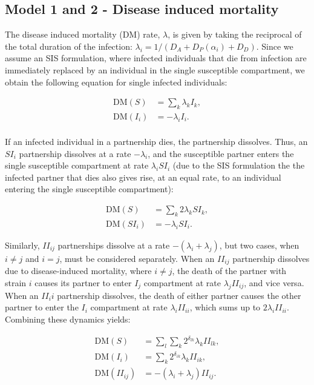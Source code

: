 \documentclass[10pt,letterpaper]{article}
\newcommand{\DM}{\textrm{DM}}
\begin{document}
\subsection*{Model 1 and 2 - Disease induced mortality}

The disease induced mortality (DM) rate, $\lambda$, is given by taking the reciprocal of the total duration of the infection: $\lambda_i = 1/(D_A + D_P(\alpha_i) + D_D)$. Since we assume an SIS formulation, where infected individuals that die from infection are immediately replaced by an individual in the single susceptible compartment, we obtain the following equation for single infected individuals:

\begin{equation}
\begin{aligned}
\DM(S) &= \sum_k \lambda_k I_k, \\
\DM(I_i) &= - \lambda_i I_i. \\
\end{aligned}
\end{equation}

If an infected individual in a partnership dies, the partnership dissolves. Thus, an $SI_i$ partnership dissolves at a rate $-\lambda_i$, and the susceptible partner enters the single susceptible compartment at rate $\lambda_i SI_i$ (due to the SIS formulation the the infected partner that dies also gives rise, at an equal rate, to an individual entering the single susceptible compartment):

\begin{equation}
\begin{aligned}
\DM(S) &= \sum_k 2 \lambda_k SI_k, \\
\DM(SI_i) &= - \lambda_i SI_i.
\end{aligned}
\end{equation}

Similarly, $II_{ij}$ partnerships dissolve at a rate $-(\lambda_i + \lambda_j)$, but two cases, when $i \neq j$ and $i = j$, must be considered separately. When an $II_{ij}$ partnership dissolves due to disease-induced mortality, where $i \neq j$, the death of the partner with strain $i$ causes its partner to enter $I_j$ compartment at rate $\lambda_j II_{ij}$, and vice versa. When an $II_ii$ partnership dissolves, the death of either partner causes the other partner to enter the $I_i$ compartment at rate $\lambda_i II_{ii}$, which sums up to $2\lambda_i II_{ii}$. Combining these dynamics yields:

\begin{equation}
\begin{aligned}
\DM(S) &= \sum_l \sum_k  2^{\delta_{lk}} \lambda_k II_{lk}, \\
\DM(I_i) &=  \sum_k 2^{\delta_{ik}} \lambda_k II_{ik}, \\
\DM(II_{ij}) &= -(\lambda_i + \lambda_j) II_{ij}.
\end{aligned}
\end{equation}
\end{document}
